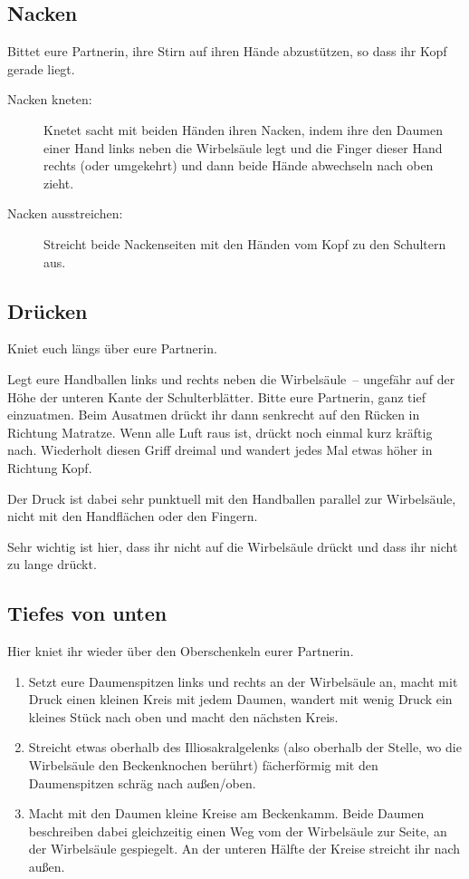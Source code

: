 \subsection{Nacken}

Bittet eure Partnerin, ihre Stirn auf ihren Hände abzustützen, so dass ihr Kopf gerade liegt.

\begin{description}
  \item[Nacken kneten:] Knetet sacht mit beiden Händen ihren Nacken, indem ihre den Daumen einer Hand links neben die Wirbelsäule legt und die Finger dieser Hand rechts (oder umgekehrt) und dann beide Hände abwechseln nach oben zieht.
  \item[Nacken ausstreichen:] Streicht beide Nackenseiten mit den Händen vom Kopf zu den Schultern aus.
\end{description}

\subsection{Drücken}

Kniet euch längs über eure Partnerin.

Legt eure Handballen links und rechts neben die Wirbelsäule~-- ungefähr auf der Höhe der unteren Kante der Schulterblätter. Bitte eure Partnerin, ganz tief einzuatmen. Beim Ausatmen drückt ihr dann senkrecht auf den Rücken in Richtung Matratze. Wenn alle Luft raus ist, drückt noch einmal kurz kräftig nach. Wiederholt diesen Griff dreimal und wandert jedes Mal etwas höher in Richtung Kopf.

Der Druck ist dabei sehr punktuell mit den Handballen parallel zur Wirbelsäule, nicht mit den Handflächen oder den Fingern.

Sehr wichtig ist hier, dass ihr nicht auf die Wirbelsäule drückt und dass ihr nicht zu lange drückt.

\subsection{Tiefes von unten}

Hier kniet ihr wieder über den Oberschenkeln eurer Partnerin.

\begin{enumerate}
  \item {} Setzt eure Daumenspitzen links und rechts an der Wirbelsäule an, macht mit Druck einen kleinen Kreis mit jedem Daumen, wandert mit wenig Druck ein kleines Stück nach oben und macht den nächsten Kreis.
  \item {} Streicht etwas oberhalb des Illiosakralgelenks (also oberhalb der Stelle, wo die Wirbelsäule den Beckenknochen berührt) fächerförmig mit den Daumenspitzen schräg nach außen/oben.
  \item {} Macht mit den Daumen kleine Kreise am Beckenkamm. Beide Daumen beschreiben dabei gleichzeitig einen Weg vom der Wirbelsäule zur Seite, an der Wirbelsäule gespiegelt. An der unteren Hälfte der Kreise streicht ihr nach außen.
\end{enumerate}



